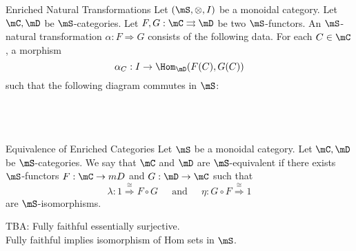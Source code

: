 \documentclass[a4paper]{article}
\begin{document}
\begin{defn}{Enriched Natural Transformations}{} Let $(\mS,\otimes,I)$ be a monoidal category. Let $\mC,\mD$ be $\mS$-categories. Let $F,G:\mC\rightrightarrows\mD$ be two $\mS$-functors. An $\mS$-natural transformation $\alpha:F\Rightarrow G$ consists of the following data. For each $C\in\mC$, a morphism $$\alpha_C:I\to\Hom_\mD(F(C),G(C))$$ such that the following diagram commutes in $\mS$: \\~\\
\\~\\
\end{defn}

\begin{defn}{Equivalence of Enriched Categories}{} Let $\mS$ be a monoidal category. Let $\mC,\mD$ be $\mS$-categories. We say that $\mC$ and $\mD$ are $\mS$-equivalent if there exists $\mS$-functors $F:\mC\to mD$ and $G:\mD\to\mC$ such that $$\lambda:1\overset{\cong}{\Rightarrow}F\circ G\;\;\;\;\text{ and }\;\;\;\;\eta:G\circ F\overset{\cong}{\Rightarrow}1$$ are $\mS$-isomorphisms. 
\end{defn}

TBA: Fully faithful essentially surjective. \\

Fully faithful implies isomorphism of Hom sets in $\mS$. 
\end{document}

